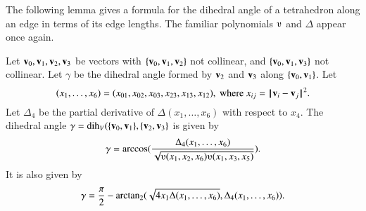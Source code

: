 The following lemma gives a formula for the dihedral angle
of a tetrahedron along an edge in terms of its edge lengths.  The
familiar polynomials $\ups$ and $\Delta$ appear once again.
%
%


\begin{lemma}[]\label{lemma:dihform}
Let ${\mathbf v}_0,{\mathbf v}_1,{\mathbf v}_2,{\mathbf v}_3$ 
be vectors with $\{{\mathbf v}_0,{\mathbf v}_1,{\mathbf v}_2\}$ not collinear, 
and $\{{\mathbf v}_0,{\mathbf v}_1,{\mathbf v}_3\}$ not
collinear. 
Let $\gamma$ be the dihedral angle formed
by ${\mathbf v}_2$ and ${\mathbf v}_3$ along $\{{\mathbf v}_0,{\mathbf v}_1\}$. Let
\begin{displaymath}(x_1,\ldots,x_6) = 
(x_{01},x_{02},x_{03},x_{23},x_{13},x_{12}),
\text{ where } x_{ij}=\norm{\v_i}{\v_j}^2.\end{displaymath}
Let $\Delta_4$ be the partial derivative of $\Delta(x_1,\ldots,x_6)$ with
respect to $x_4$.
The dihedral angle $\gamma=\operatorname{dih}_V(\{{\mathbf v}_0,{\mathbf v}_1\},\{{\mathbf v}_2,{\mathbf v}_3\}$
is given by
\begin{displaymath}
\gamma=\arccos(\frac{\Delta_4(x_1,\ldots,x_6)}{\sqrt{
\ups(x_1,x_2,x_6)\ups(x_1,x_3,x_5)}}).
\end{displaymath}
It is also given by
\begin{displaymath}
\gamma=\frac{\pi}{2} - {\operatorname{arctan_2}}
({\sqrt{4 x_1 \Delta(x_1,\ldots,x_6)}},{\Delta_4(x_1,\ldots,x_6)}).
\end{displaymath}
\end{lemma}
%


